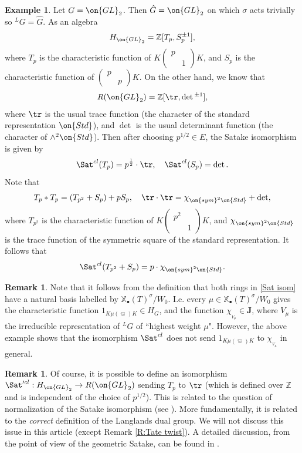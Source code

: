 \documentclass[11pt]{amsart}
\theoremstyle{definition}
\theoremstyle{definition}
\newtheorem{ex}[thm]{Example}
\newtheorem{rmk}[thm]{Remark}
\theoremstyle{definition}
\numberwithin{equation}{subsection}
\newcommand{\bZ}{{\mathbb Z}}
\newcommand{\GL}{{\on{GL}}}
\def\xcoch{\mathbb{X}_\bullet}
\begin{document}
\begin{ex}
Let $G=\GL_2$. Then $\hat{G}=\GL_2$ on which $\sigma$ acts trivially so ${^L}G=\hat{G}$. As an algebra 
$$H_{\GL_2}=\bZ[T_p,S_p^{\pm 1}],$$
where $T_p$ is the characteristic function of $K\begin{pmatrix}p&\\&1\end{pmatrix}K$, and $S_p$ is the characteristic function of $\begin{pmatrix}p&\\&p\end{pmatrix}K$.
On the other hand, we know that 
$$R(\GL_2)=\bZ[\tr,\det{^{\pm 1}}],$$
where $\tr$ is the usual trace function (the character of the standard representation $\on{Std}$), and $\det$ is the usual determinant function (the character of $\wedge^2\on{Std}$). Then after choosing $p^{1/2}\in E$, the Satake isomorphism is given by
$$\Sat^{cl}(T_p)=p^{\frac{1}{2}}\cdot \tr,\quad \Sat^{cl}(S_p)=\det.$$
Note that 
\[T_p* T_p= (T_{p^2}+S_p)+pS_p,\quad \tr\cdot \tr= \chi_{\on{sym}^2\on{Std}}+\det,\]
where $T_{p^2}$ is the characteristic function of $K\begin{pmatrix}p^2&\\&1\end{pmatrix}K$, and $\chi_{\on{sym}^2\on{Std}}$ is the trace function of the symmetric square of the standard representation.
It follows that
\begin{equation}\label{upper tr}
\Sat^{cl}(T_{p^2}+S_p)=p\cdot\chi_{\on{sym}^2\on{Std}}.
\end{equation}
\end{ex}
\begin{rmk}
Note that it follows from the definition that both rings in \eqref{Sat isom} have a natural basis labelled by $\xcoch(T)^\sigma/W_0$. I.e. every $\mu\in \xcoch(T)^\sigma/W_0$ gives the characteristic function $1_{K\mu(\varpi)K}\in H_G$, and the function $\chi_{_{V_\mu}}\in \mathbf J$, where $V_\mu$ is the irreducible representation of ${^L}G$ of ``highest weight $\mu$".
However, the above example shows that the isomorphism $\Sat^{cl}$ does not send $1_{K\mu(\varpi)K}$ to $\chi_{_{V_\mu}}$ in general.
\end{rmk}

\begin{rmk}
\label{R: norm Sat}
Of course, it is possible to define an isomorphism $\Sat'^{cl}: H_{\GL_2}\to R(\GL_2)$ sending $T_p$ to $\tr$ (which is defined over $\bZ$ and is independent of the choice of $p^{1/2}$). This is related to the question of normalization of the Satake isomorphism (see \cite[\S 8]{Gr}). More fundamentally, it is related to the \emph{correct} definition of the Langlands dual group. We will not discuss this issue in this article (except Remark \ref{R:Tate twist}). A detailed discussion, from the point of view of the geometric Satake, can be found in \cite[\S 5.5]{Zh2}. 
\end{rmk}
\end{document}
